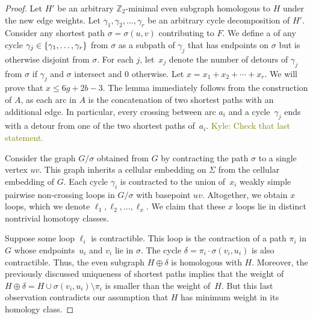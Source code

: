 \documentclass[letterpaper,review]{siamart190516}
\def\Z{\mathbb{Z}}
\def\anote#1{\color{purple}Amir: #1 \color{black}}
\def\rnote#1{\color{red}Review: #1 \color{black}}
\def\knote#1{\textcolor{olive}{Kyle: #1}}
\begin{document}
\begin{proof}
Let $H'$ be an arbitrary $\Z_2$-minimal even subgraph homologous to $H$ under the new edge weights.
Let $\gamma_1, \gamma_2, \dots, \gamma_r$ be an arbitrary cycle decomposition of $H'$.
Consider any shortest path \(\sigma = \sigma(u, v)\) contributing to \(F\).
We define a  of any cycle \(\gamma_j \in \left\{ \gamma_1, \dots, \gamma_r \right\}\) from
\(\sigma\) as a subpath of \(\gamma_j\) that has endpoints on \(\sigma\) but is otherwise disjoint
from \(\sigma\).
For each $j$, let~$x_j$ denote the number of detours of \(\gamma_j\) from $\sigma$ if \(\gamma_j\)
and \(\sigma\) intersect and \(0\) otherwise.
Let $x = x_1 + x_2 + \cdots + x_r$.
We will prove that $x\le 6g+2b-3$.
The lemma immediately follows from the construction of $A$, as each arc in $A$ is the concatenation
of two shortest paths with an additional edge.
In particular, every crossing between arc \(a_i\) and a cycle~\(\gamma_j\) ends with a detour from
one of the two shortest paths of~\(a_i\).
\knote{Check that last statement.}

Consider the graph $G/\sigma$ obtained from $G$ by contracting the path $\sigma$ to a single vertex $uv$.
This graph inherits a cellular embedding on $\Sigma$ from the cellular embedding of $G$.
Each cycle $\gamma_i$ is contracted to the union of~$x_i$ weakly simple pairwise non-crossing loops
in $G/\sigma$ with basepoint $uv$.
Altogether, we obtain $x$ loops, which we denote $\ell_1, \ell_2, \dots, \ell_x$.
We claim that these $x$ loops lie in distinct nontrivial homotopy classes.

Suppose some loop $\ell_i$ is contractible.  This loop is the contraction of a path $\pi_i$ in $G$
whose endpoints~$u_i$ and $v_i$ lie in $\sigma$.  The cycle $\delta = \pi_i \cdot \sigma(v_i,u_i)$
is also contractible.  Thus, the even subgraph $H\oplus\delta$ is homologous with $H$.  Moreover,
the previously discussed uniqueness of shortest paths implies that the weight of $H\oplus\delta = H \cup \sigma(v_i,u_i) \setminus \pi_i$ is smaller than the weight of~$H$.
But this last observation contradicts our assumption that $H $ has minimum weight in its homology
class.


\end{proof}
\end{document}
